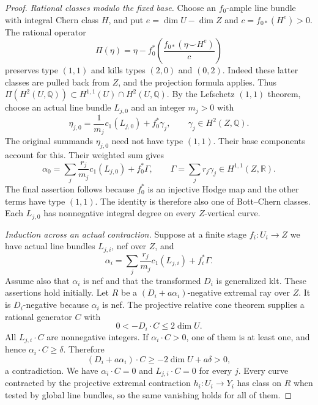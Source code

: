 \begin{proof}
\emph{Rational classes modulo the fixed base.}
Choose an $f_0$-ample line bundle with integral Chern class $H$, and
put $e=\dim U-\dim Z$ and $c=f_{0*}(H^e)>0$. The rational operator
\[
 \Pi(\eta)=\eta-
 f_0^*\!\left(\frac{f_{0*}(\eta\smile H^e)}{c}\right)
\]
preserves type $(1,1)$ and kills types $(2,0)$ and $(0,2)$.
Indeed these latter classes are pulled back from $Z$, and the
projection formula applies. Thus
$\Pi(H^2(U,\mathbb Q))\subset H^{1,1}(U)\cap H^2(U,\mathbb Q)$.
By the Lefschetz $(1,1)$ theorem, choose an actual line bundle
$L_{j,0}$ and an integer $m_j>0$ with
\[
 \eta_{j,0}=\frac1{m_j}c_1(L_{j,0})+f_0^*\gamma_j,
 \qquad \gamma_j\in H^2(Z,\mathbb Q).
\]
The original summands $\eta_{j,0}$ need not have type $(1,1)$.
Their base components account for this. Their weighted sum gives
\begin{equation}\label{repair:eq:relative-nqc-line-expression}
 \alpha_0=\sum_j\frac{r_j}{m_j}c_1(L_{j,0})+f_0^*\Gamma,
 \qquad \Gamma=\sum_jr_j\gamma_j\in H^{1,1}(Z,\mathbb R).
\end{equation}
The final assertion follows because $f_0^*$ is an injective Hodge
map and the other terms have type $(1,1)$. The identity is therefore
also one of Bott--Chern classes.
Each $L_{j,0}$ has nonnegative integral degree on every
$Z$-vertical curve.

\smallskip\noindent
\emph{Induction across an actual contraction.}
Suppose at a finite stage $f_i:U_i\to Z$ we have actual line bundles
$L_{j,i}$, nef over $Z$, and
\[
 \alpha_i=\sum_j\frac{r_j}{m_j}c_1(L_{j,i})+f_i^*\Gamma.
\]
Assume also that $\alpha_i$ is nef and that the transformed
$D_i$ is generalized klt. These assertions hold initially.
Let $R$ be a $(D_i+a\alpha_i)$-negative extremal ray over $Z$.
It is $D_i$-negative because $\alpha_i$ is nef. The projective
relative cone theorem supplies a rational generator $C$ with
\[
                     0<-D_i\cdot C\leq2\dim U.
\]
All $L_{j,i}\cdot C$ are nonnegative integers. If
$\alpha_i\cdot C>0$, one of them is at least one, and hence
$\alpha_i\cdot C\geq\delta$. Therefore
\[
 (D_i+a\alpha_i)\cdot C
             \geq-2\dim U+a\delta>0,
\]
a contradiction. We have $\alpha_i\cdot C=0$ and
$L_{j,i}\cdot C=0$ for every $j$. Every curve contracted by the
projective extremal contraction $h_i:U_i\to Y_i$ has class on
$R$ when tested by global line bundles, so the same vanishing
holds for all of them.


\end{proof}
